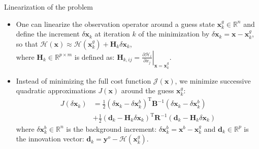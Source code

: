 \documentclass[8pt]{beamer}
\begin{document}
\begin{frame}{Linearization of the problem}
\begin{itemize}
\item One can linearize the observation operator around a guess state $\mathbf{x}^g_k \in \mathbb{R}^n$ and define the increment $\delta \mathbf{x}_k$ at iteration $k$ of the minimization by $\delta \mathbf{x}_k =  \mathbf{x}-\mathbf{x}^g_k$, so that
$\mathcal{H}(\mathbf{x}) \approx \mathcal{H}(\mathbf{x}^g_k) + \mathbf{H}_k \delta \mathbf{x}_k$,\\
where $\mathbf{H}_k \in \mathbb{R}^{p \times m}$ is defined as: $\mathbf{H}_{k,ij} = \left.\frac{\partial \mathcal{H}_i}{\partial x_j}\right|_{\mathbf{x} = \mathbf{x}^g_k}$.

\item Instead of minimizing the full cost function $\mathcal{J}(\mathbf{x})$, we minimize successive quadratic approximations $J(\mathbf{x})$ around the guess $\mathbf{x}^g_k$:
\begin{align}
J \left(\delta \mathbf{x}_k\right) & = \frac{1}{2} \left(\delta \mathbf{x}_k-\delta \mathbf{x}^b_k\right)^\mathrm{T} \mathbf{B}^{-1} \left(\delta \mathbf{x}_k-\delta \mathbf{x}^b_k\right) \nonumber \\
& + \frac{1}{2} \left(\mathbf{d}_k - \mathbf{H}_k \delta \mathbf{x}_k\right)^\mathrm{T} \mathbf{R}^{-1} \left(\mathbf{d}_k - \mathbf{H}_k \delta \mathbf{x}_k\right)
\end{align}
where $\delta \mathbf{x}^b_k  \in \mathbb{R}^n$ is the background increment: $\delta \mathbf{x}^b_k = \mathbf{x}^b - \mathbf{x}^g_k$ and $\mathbf{d}_k \in \mathbb{R}^p$ is the innovation vector: $\mathbf{d}_k = \mathbf{y}^o - \mathcal{H}(\mathbf{x}^g_k)$.
\end{itemize}
\end{frame}
\end{document}
